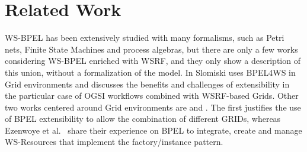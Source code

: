 \section{Related Work}\label{rWork}
WS-BPEL has been extensively studied with many formalisms, such as
Petri nets, Finite State Machines and process algebras, but
there are only a few works considering WS-BPEL enriched with
WSRF, and they only show a description of this union,
without a formalization of the model.
In \cite{Slomiski:2006} Slomiski uses BPEL4WS in Grid environments and discusses the
benefits and challenges of extensibility in the particular case of OGSI workflows
combined with WSRF-based Grids. Other two works centered around Grid environments are
\cite{Leymann:2006} and \cite{Ezenwoye:2007}. The first justifies
the use of BPEL extensibility to allow the combination of different GRIDs, whereas
Ezenwoye et al.~\cite{Ezenwoye:2007} share their experience on BPEL to integrate,
create and manage WS-Resources that implement the factory/instance pattern.

